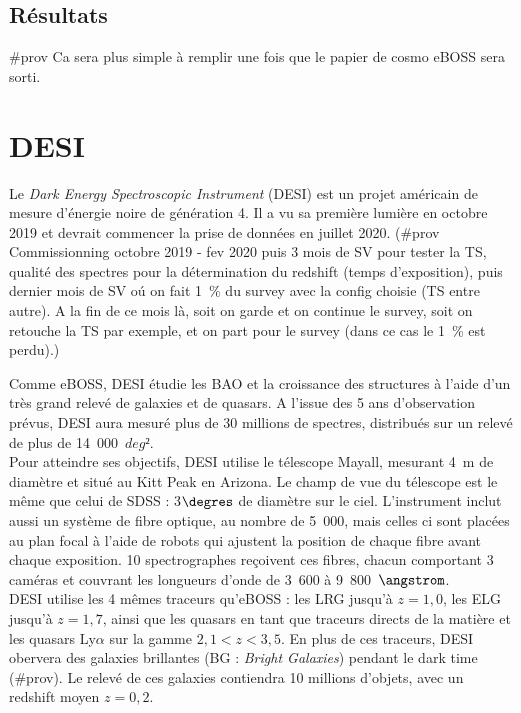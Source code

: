 \documentclass[11pt, twoside, a4paper, openright]{report}
\begin{document}
\subsection{Résultats}

\#prov Ca sera plus simple à remplir une fois que le papier de cosmo eBOSS sera sorti.

\section{DESI}

Le \emph{Dark Energy Spectroscopic Instrument} (DESI) \cite{DESICollaboration2016} est un projet américain de mesure d'énergie noire de génération 4. Il a vu sa première lumière en octobre 2019 et devrait commencer la prise de données en juillet 2020. (\#prov Commissionning octobre 2019 - fev 2020 puis 3 mois de SV pour tester la TS, qualité des spectres pour la détermination du redshift (temps d'exposition), puis dernier mois de SV oú on fait 1~\% du survey avec la config choisie (TS entre autre). A la fin de ce mois là, soit on garde et on continue le survey, soit on retouche la TS par exemple, et on part pour le survey (dans ce cas le 1~\% est perdu).)

Comme eBOSS, DESI étudie les BAO et la croissance des structures à l'aide d'un très grand relevé de galaxies et de quasars. A l'issue des 5 ans d'observation prévus, DESI aura mesuré plus de 30 millions de spectres, distribués sur un relevé de plus de 14~000~$deg²$. \\
Pour atteindre ses objectifs, DESI utilise le télescope Mayall, mesurant 4~m de diamètre et situé au Kitt Peak en Arizona. Le champ de vue du télescope est le même que celui de SDSS : 3$\degres$ de diamètre sur le ciel. L'instrument inclut aussi un système de fibre optique, au nombre de 5~000, mais celles ci sont placées au plan focal à l'aide de robots qui ajustent la position de chaque fibre avant chaque exposition. 10 spectrographes reçoivent ces fibres, chacun comportant 3 caméras et couvrant les longueurs d'onde de 3~600 à 9~800~$\angstrom$. \\
‌‌DESI utilise les 4 mêmes traceurs qu'eBOSS : les LRG jusqu'à $z=1,0$, les ELG jusqu'à $z=1,7$, ainsi que les quasars en tant que traceurs directs de la matière et les quasars Ly$\alpha$ sur la gamme $2,1 < z < 3,5$. En plus de ces traceurs, DESI obervera des galaxies brillantes (BG : \emph{Bright Galaxies}) pendant le dark time (\#prov). Le relevé de ces galaxies contiendra 10 millions d'objets, avec un redshift moyen $z=0,2$.
\end{document}
